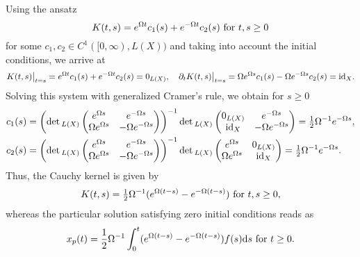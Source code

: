 \documentclass[12pt]{article}
\numberwithin{equation}{section}
\numberwithin{equation}{section}
\begin{document}
	Using the ansatz
	\begin{equation}
		K(t, s) = e^{\Omega t} c_{1}(s) + e^{-\Omega t} c_{2}(s) \text{ for } t, s \geq 0 \notag
	\end{equation}
	for some $c_{1}, c_{2} \in C^{1}([0, \infty), L(X))$
	and taking into account the initial conditions, we arrive at
	\begin{equation}
		K(t, s)\big|_{t = s} = e^{\Omega t} c_{1}(s) + e^{-\Omega t} c_{2}(s) = 0_{L(X)}, \quad
		\partial_{t} K(t, s)\big|_{t = s} = \Omega e^{\Omega s} c_{1}(s) - \Omega e^{-\Omega s} c_{2}(s) = \mathrm{id}_{X}. \notag
	\end{equation}
	Solving this system with generalized Cramer's rule, we obtain for $s \geq 0$
	\begin{equation}
		\begin{split}
			c_{1}(s) &=
			\left(\det{}_{L(X)}\begin{pmatrix}
				e^{\Omega s} & e^{-\Omega s} \\
				\Omega e^{\Omega s} & -\Omega e^{-\Omega s}
			\end{pmatrix}\right)^{-1}
			\det{}_{L(X)}\begin{pmatrix}
				0_{L(X)} & e^{-\Omega s} \\
				\mathrm{id}_{X} & -\Omega e^{-\Omega s}
			\end{pmatrix}
			= \tfrac{1}{2} \Omega^{-1} e^{-\Omega s}, \\
						c_{2}(s) &=
			\left(\det{}_{L(X)}\begin{pmatrix}
				e^{\Omega s} & e^{-\Omega s} \\
				\Omega e^{\Omega s} & -\Omega e^{-\Omega s}
			\end{pmatrix}\right)^{-1}
			\det{}_{L(X)}\begin{pmatrix}
				e^{\Omega s} & 0_{L(X)} \\
				\Omega e^{\Omega s} & \mathrm{id}_{X}
			\end{pmatrix}
			= \tfrac{1}{2} \Omega^{-1} e^{-\Omega s}.
		\end{split}
		\notag
	\end{equation}
	Thus, the Cauchy kernel is given by
	\begin{equation}
		K(t, s) = \tfrac{1}{2} \Omega^{-1} (e^{\Omega(t - s)} - e^{-\Omega(t - s)}) \text{ for } t, s \geq 0, \notag
	\end{equation}
	whereas the particular solution satisfying zero initial conditions reads as
	\begin{equation}
		x_{p}(t) = \frac{1}{2} \Omega^{-1} \int_{0}^{t} (e^{\Omega (t - s)} - e^{-\Omega (t - s)}) f(s) \mathrm{d}s \text{ for } t \geq 0. \notag
	\end{equation}
	
\end{document}
